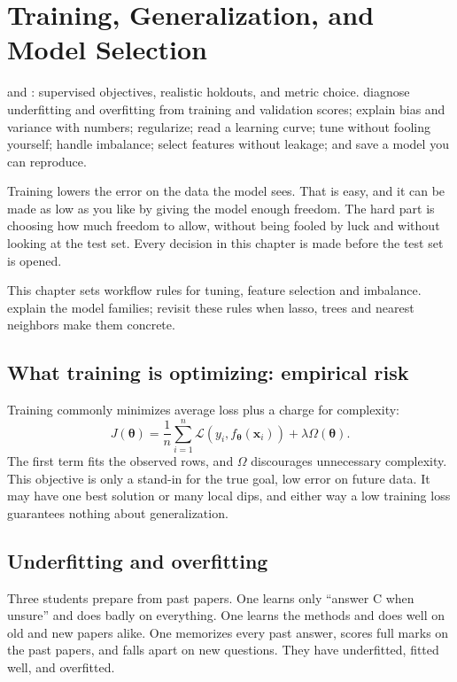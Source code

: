 \chapter{Training, Generalization, and Model Selection}
\label{ch:training}

\chapterguide%
  { and : supervised objectives, realistic holdouts, and metric choice.}
  {diagnose underfitting and overfitting from training and validation scores; explain bias and variance with numbers; regularize; read a learning curve; tune without fooling yourself; handle imbalance; select features without leakage; and save a model you can reproduce.}

Training lowers the error on the data the model sees. That is easy, and it can be made as low as you like by giving the model enough freedom. The hard part is choosing how much freedom to allow, without being fooled by luck and without looking at the test set. Every decision in this chapter is made before the test set is opened.

\begin{coursechoice}
This chapter sets workflow rules for tuning, feature selection and imbalance.  explain the model families; revisit these rules when lasso, trees and nearest neighbors make them concrete.
\end{coursechoice}

\section{What training is optimizing: empirical risk}

Training commonly minimizes average loss plus a charge for complexity:
\[
  J(\bm{\theta})
  =\frac{1}{n}\sum_{i=1}^{n}
  \mathcal{L}(y_i,f_{\bm{\theta}}(\bm{x}_i))
  +\lambda\Omega(\bm{\theta}).
\]
The first term fits the observed rows, and $\Omega$ discourages unnecessary complexity. This objective is only a stand-in for the true goal, low error on future data. It may have one best solution or many local dips, and either way a low training loss guarantees nothing about generalization.

\section{Underfitting and overfitting}

\begin{analogy}
Three students prepare from past papers. One learns only ``answer C when unsure'' and does badly on everything. One learns the methods and does well on old and new papers alike. One memorizes every past answer, scores full marks on the past papers, and falls apart on new questions. They have underfitted, fitted well, and overfitted.
\end{analogy}


